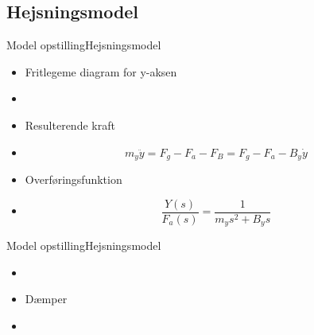\subsection{Hejsningsmodel}
\begin{frame}{Model opstilling}{Hejsningsmodel}
  \begin{minipage}[t]{0.45\linewidth}
    \begin{itemize}
    	\item<1->[] Fritlegeme diagram for y-aksen 
      	\item<1->[] {
              \begin{figure}[H]
              \centering
              \scalebox{0.75}{}
              \end{figure}}    
    \end{itemize}           
  \end{minipage}
  \begin{minipage}[t]{0.48\linewidth}
\begin{itemize}
    	\item<2->[] Resulterende kraft  
    	\item<2->[] {
    		\begin{equation*}
				m_y \ddot{y} = F_g - F_a - F_B = F_g - F_a - B_y \dot{y}
			\end{equation*}}
	\end{itemize}
	\bigskip
	\begin{itemize}
	    	\item<3->[] Overføringsfunktion
    		\item<3->[] {
    		\begin{equation*}
				\frac{Y(s)}{F_a(s)} = \frac{1}{m_y s^2 + B_y s}
			\end{equation*}}
	\end{itemize}                
  \end{minipage}
\end{frame} 

\begin{frame}{Model opstilling}{Hejsningsmodel}
  \begin{minipage}[t]{0.48\linewidth}
    \begin{itemize}
      	\item<1->[] {
              \begin{figure}[H]
              \centering
              
              \end{figure}}  
        \item<2-> Dæmper       
    \end{itemize}           
  \end{minipage}
  \begin{minipage}[t]{0.48\linewidth} 
    \begin{itemize}            
	\item<3->[] {
              \begin{figure}[H]
              \centering
              
              \end{figure}}	     	
    \end{itemize}           
  \end{minipage}
\end{frame} 

